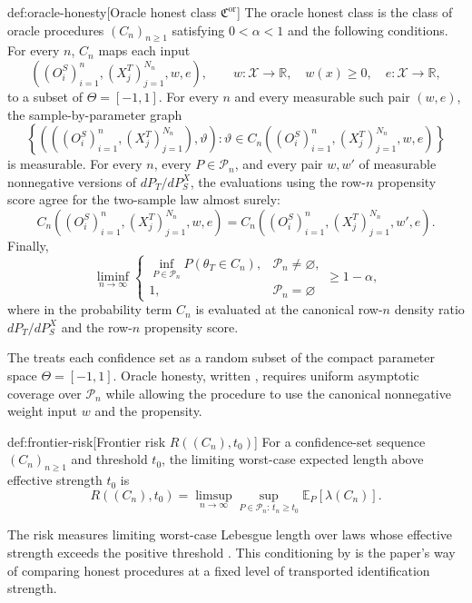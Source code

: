 \begin{definitionv}{def:oracle-honesty}[Oracle honest class $\mathfrak C^{\mathrm{or}}$]
The oracle honest class is the class of oracle procedures \((C_n)_{n\ge1}\) satisfying \(0<\alpha<1\) and the following conditions.  For every \(n\), \(C_n\) maps each input
\[
\left((O_i^S)_{i=1}^n,(X_j^T)_{j=1}^{N_n},w,e\right),
\qquad
w:\mathcal X\to\mathbb R,\quad w(x)\ge0,\quad e:\mathcal X\to\mathbb R,
\]
to a subset of \(\Theta=[-1,1]\).  For every \(n\) and every measurable such pair \((w,e)\), the sample-by-parameter graph
\[
\left\{
\left(((O_i^S)_{i=1}^n,(X_j^T)_{j=1}^{N_n}),\vartheta\right):
\vartheta\in
C_n\!\left((O_i^S)_{i=1}^n,(X_j^T)_{j=1}^{N_n},w,e\right)
\right\}
\]
is measurable.  For every \(n\), every \(P\in\mathcal P_n\), and every pair \(w,w'\) of measurable nonnegative versions of \(dP_T/dP_S^X\), the evaluations using the row-\(n\) propensity score agree for the two-sample law almost surely:
\[
C_n\!\left((O_i^S)_{i=1}^n,(X_j^T)_{j=1}^{N_n},w,e\right)
=
C_n\!\left((O_i^S)_{i=1}^n,(X_j^T)_{j=1}^{N_n},w',e\right).
\]
Finally,
\[
\liminf_{n\to\infty}
\begin{cases}
\displaystyle \inf_{P\in\mathcal P_n}
P\!\left(\theta_T\in C_n\right), & \mathcal P_n\neq\varnothing,\\[0.8em]
1, & \mathcal P_n=\varnothing
\end{cases}
\ge 1-\alpha,
\]
where in the probability term \(C_n\) is evaluated at the canonical row-\(n\) density ratio \(dP_T/dP_S^X\) and the row-\(n\) propensity score.
\end{definitionv}

The  treats each confidence set  as a random subset of the compact parameter space \(\Theta=[-1,1]\).  Oracle honesty, written , requires uniform asymptotic coverage over \(\mathcal P_n\) while allowing the procedure to use the canonical nonnegative weight input \(w\) and the propensity.

\begin{definitionv}{def:frontier-risk}[Frontier risk $R((C_n),t_0)$]
For a confidence-set sequence \((C_n)_{n\ge1}\) and threshold \(t_0\), the limiting worst-case expected length above effective strength \(t_0\) is
\[
R((C_n),t_0)
=
\limsup_{n\to\infty}
\sup_{P\in\mathcal P_n:\,t_n\ge t_0}
\mathbb E_P[\lambda(C_n)].
\]
\end{definitionv}

The risk  measures limiting worst-case Lebesgue length  over laws whose effective strength exceeds the positive threshold .  This conditioning by  is the paper's way of comparing honest procedures at a fixed level of transported identification strength.

